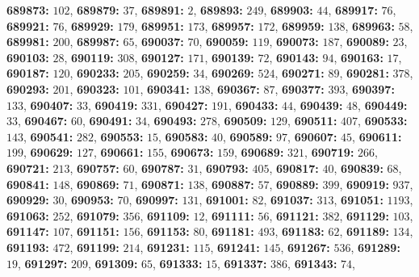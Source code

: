 \textsf{\bfseries 689873:} $102$, \textsf{\bfseries 689879:} $37$, \textsf{\bfseries 689891:} $2$, \textsf{\bfseries 689893:} $249$, \textsf{\bfseries 689903:} $44$, \textsf{\bfseries 689917:} $76$, \textsf{\bfseries 689921:} $76$, \textsf{\bfseries 689929:} $179$, \textsf{\bfseries 689951:} $173$, \textsf{\bfseries 689957:} $172$, \textsf{\bfseries 689959:} $138$, \textsf{\bfseries 689963:} $58$, \textsf{\bfseries 689981:} $200$, \textsf{\bfseries 689987:} $65$, \textsf{\bfseries 690037:} $70$, \textsf{\bfseries 690059:} $119$, \textsf{\bfseries 690073:} $187$, \textsf{\bfseries 690089:} $23$, \textsf{\bfseries 690103:} $28$, \textsf{\bfseries 690119:} $308$, \textsf{\bfseries 690127:} $171$, \textsf{\bfseries 690139:} $72$, \textsf{\bfseries 690143:} $94$, \textsf{\bfseries 690163:} $17$, \textsf{\bfseries 690187:} $120$, \textsf{\bfseries 690233:} $205$, \textsf{\bfseries 690259:} $34$, \textsf{\bfseries 690269:} $524$, \textsf{\bfseries 690271:} $89$, \textsf{\bfseries 690281:} $378$, \textsf{\bfseries 690293:} $201$, \textsf{\bfseries 690323:} $101$, \textsf{\bfseries 690341:} $138$, \textsf{\bfseries 690367:} $87$, \textsf{\bfseries 690377:} $393$, \textsf{\bfseries 690397:} $133$, \textsf{\bfseries 690407:} $33$, \textsf{\bfseries 690419:} $331$, \textsf{\bfseries 690427:} $191$, \textsf{\bfseries 690433:} $44$, \textsf{\bfseries 690439:} $48$, \textsf{\bfseries 690449:} $33$, \textsf{\bfseries 690467:} $60$, \textsf{\bfseries 690491:} $34$, \textsf{\bfseries 690493:} $278$, \textsf{\bfseries 690509:} $129$, \textsf{\bfseries 690511:} $407$, \textsf{\bfseries 690533:} $143$, \textsf{\bfseries 690541:} $282$, \textsf{\bfseries 690553:} $15$, \textsf{\bfseries 690583:} $40$, \textsf{\bfseries 690589:} $97$, \textsf{\bfseries 690607:} $45$, \textsf{\bfseries 690611:} $199$, \textsf{\bfseries 690629:} $127$, \textsf{\bfseries 690661:} $155$, \textsf{\bfseries 690673:} $159$, \textsf{\bfseries 690689:} $321$, \textsf{\bfseries 690719:} $266$, \textsf{\bfseries 690721:} $213$, \textsf{\bfseries 690757:} $60$, \textsf{\bfseries 690787:} $31$, \textsf{\bfseries 690793:} $405$, \textsf{\bfseries 690817:} $40$, \textsf{\bfseries 690839:} $68$, \textsf{\bfseries 690841:} $148$, \textsf{\bfseries 690869:} $71$, \textsf{\bfseries 690871:} $138$, \textsf{\bfseries 690887:} $57$, \textsf{\bfseries 690889:} $399$, \textsf{\bfseries 690919:} $937$, \textsf{\bfseries 690929:} $30$, \textsf{\bfseries 690953:} $70$, \textsf{\bfseries 690997:} $131$, \textsf{\bfseries 691001:} $82$, \textsf{\bfseries 691037:} $313$, \textsf{\bfseries 691051:} $1193$, \textsf{\bfseries 691063:} $252$, \textsf{\bfseries 691079:} $356$, \textsf{\bfseries 691109:} $12$, \textsf{\bfseries 691111:} $56$, \textsf{\bfseries 691121:} $382$, \textsf{\bfseries 691129:} $103$, \textsf{\bfseries 691147:} $107$, \textsf{\bfseries 691151:} $156$, \textsf{\bfseries 691153:} $80$, \textsf{\bfseries 691181:} $493$, \textsf{\bfseries 691183:} $62$, \textsf{\bfseries 691189:} $134$, \textsf{\bfseries 691193:} $472$, \textsf{\bfseries 691199:} $214$, \textsf{\bfseries 691231:} $115$, \textsf{\bfseries 691241:} $145$, \textsf{\bfseries 691267:} $536$, \textsf{\bfseries 691289:} $19$, \textsf{\bfseries 691297:} $209$, \textsf{\bfseries 691309:} $65$, \textsf{\bfseries 691333:} $15$, \textsf{\bfseries 691337:} $386$, \textsf{\bfseries 691343:} $74$, 
